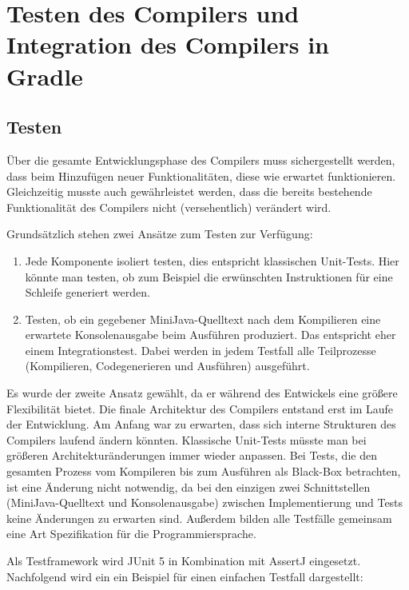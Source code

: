 \chapter{Testen des Compilers und Integration des Compilers in Gradle}

\section{Testen}

Über die gesamte Entwicklungsphase des Compilers muss sichergestellt werden, dass beim Hinzufügen neuer Funktionalitäten, diese wie erwartet funktionieren. Gleichzeitig musste auch gewährleistet werden, dass die bereits bestehende Funktionalität des Compilers nicht (versehentlich) verändert wird.

Grundsätzlich stehen zwei Ansätze zum Testen zur Verfügung:
\begin{enumerate}
    \item Jede Komponente isoliert testen, dies entspricht klassischen Unit-Tests. Hier könnte man testen, ob zum Beispiel die erwünschten Instruktionen für eine Schleife generiert werden. 
    \item Testen, ob ein gegebener MiniJava-Quelltext nach dem Kompilieren eine erwartete Konsolenausgabe beim Ausführen produziert. Das entspricht eher einem Integrationstest. Dabei werden in jedem Testfall alle Teilprozesse (Kompilieren, Codegenerieren und Ausführen) ausgeführt.
\end{enumerate}

Es wurde der zweite Ansatz gewählt, da er während des Entwickels eine größere Flexibilität bietet. Die finale Architektur des Compilers entstand erst im Laufe der Entwicklung. Am Anfang war zu erwarten, dass sich interne Strukturen des Compilers laufend ändern könnten. Klassische Unit-Tests müsste man bei größeren Architekturänderungen immer wieder anpassen. Bei Tests, die den gesamten Prozess vom Kompileren bis zum Ausführen als Black-Box betrachten, ist eine Änderung nicht notwendig, da bei den einzigen zwei Schnittstellen (MiniJava-Quelltext und Konsolenausgabe) zwischen Implementierung und Tests keine Änderungen zu erwarten sind. Außerdem bilden alle Testfälle gemeinsam eine Art Spezifikation für die Programmiersprache.

Als Testframework wird JUnit 5 \cite{JUnit} in Kombination mit AssertJ \cite{AssertJ} eingesetzt. Nachfolgend wird ein ein Beispiel für einen einfachen Testfall dargestellt:



